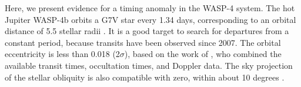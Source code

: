 \documentclass[12pt,twocolumn,tighten]{aastex62}
\begin{document}
{%
%
%

Here, we present evidence for a timing anomaly in the WASP-4 system.
The hot Jupiter WASP-4b orbits a G7V star every 1.34 days,
corresponding to an orbital distance of 5.5 stellar radii
\citep{wilson_wasp-4b_2008,huitson_gemini_2017}.  It is a good target
to search for departures from a constant period, because transits
have been observed since 2007.  The orbital eccentricity is less than
0.018 (2$\sigma$), based on the work of \cite{knutson_friends_2014},
who combined the available transit times, occultation times, and
Doppler data.  The sky projection of the stellar obliquity is also
compatible with zero, within about 10 degrees
\citep{triaud_spin-orbit_2010,sanchis-ojeda_starspots_2011}.

}
\end{document}
